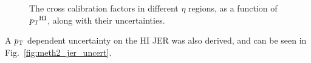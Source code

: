 \begin{figure}
	\centering
	\caption{The cross calibration factors in different $\eta$ regions, as a function of $\mbox{$p_{\mathrm{T}}$}^{\mathrm{HI}}$, along with their uncertainties.}
	\label{fig:factors_w_uncertainties}%
\end{figure}

 A $\mbox{$p_{\mathrm{T}}$}$ dependent uncertainty on the HI JER was also derived, and can be seen in Fig.~\ref{fig:meth2_jer_uncert}.


